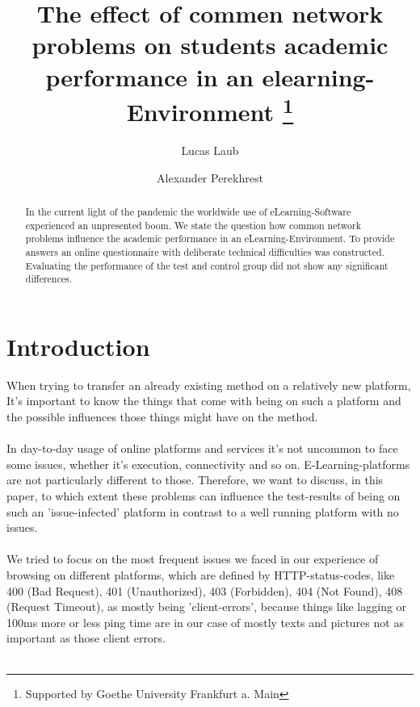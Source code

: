 \documentclass[12pt, a4paper]{article}
\begin{document}
\title{The effect of commen network problems on students academic performance in an elearning-Environment \thanks{Supported by Goethe University Frankfurt a. Main}}

\author{Lucas Laub  \and
Alexander Perekhrest }


\maketitle

\begin{abstract}
In the current light of the pandemic the worldwide use
of eLearning-Software experienced an unpresented boom.
We state the question how common network problems influence
the academic performance in an eLearning-Environment.
To provide answers an online questionnaire with deliberate
technical difficulties was constructed. Evaluating the performance
of the test and control group did not show any significant
differences.
\end{abstract}


\section{Introduction}
When trying to transfer an already existing method on a relatively new platform, 
It's important to know the things that come with being on such a platform and the 
possible influences those things might have on the method.\\\\
In day-to-day usage of online platforms and services it's not uncommon to face some 
issues, whether it's execution, connectivity and so on. E-Learning-platforms are not 
particularly different to those. Therefore, we want to discuss, in this paper, to 
which extent these problems can influence the test-results of being on such an 
'issue-infected' platform in contrast to a well running platform with no issues.\\\\
We tried to focus on the most frequent issues we faced in our experience of browsing 
on different platforms, which are defined by HTTP-status-codes, like 400 (Bad Request), 401 
(Unauthorized), 403 (Forbidden), 404 (Not Found), 408 (Request Timeout), as mostly being 'client-errors', because things like lagging or 100ms more or less ping time are in our case of mostly texts and pictures not as important as those client errors.\\\\
\end{document}

